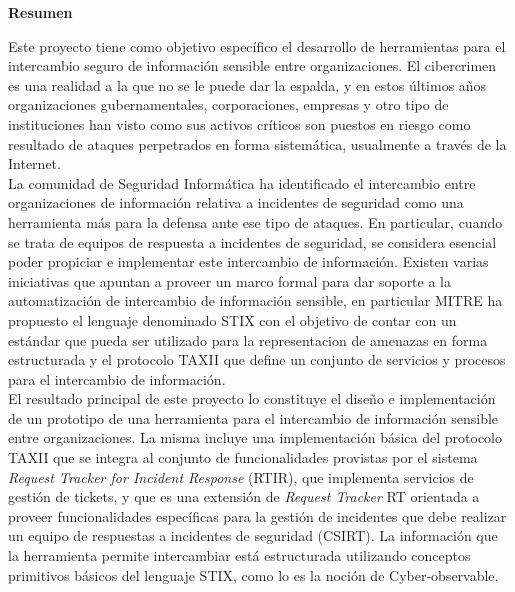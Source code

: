 {\huge \bfseries Resumen \\[0.4cm]}


Este proyecto tiene como objetivo específico el desarrollo de herramientas para el intercambio seguro de información sensible entre organizaciones. El cibercrimen es una realidad a la que no se le puede dar la espalda, y en estos últimos años organizaciones gubernamentales, corporaciones, empresas y otro tipo de instituciones han visto como sus activos críticos son puestos en riesgo como resultado de ataques perpetrados en forma sistemática, usualmente a través de la Internet. \\

La comunidad de Seguridad Informática ha identificado el intercambio entre organizaciones de información relativa a incidentes de seguridad como una herramienta más para la defensa ante ese tipo de ataques. En particular, cuando se trata de equipos de respuesta a incidentes de seguridad, se considera esencial poder propiciar e implementar este intercambio de información.
Existen varias iniciativas que apuntan a  proveer un marco formal para dar soporte a la automatización de intercambio de información sensible, en particular MITRE \cite{mitre} ha propuesto el lenguaje denominado STIX con el objetivo de contar con un estándar que pueda ser utilizado para la representacion de amenazas en forma estructurada y el protocolo TAXII que define un conjunto de servicios y procesos para el intercambio de información. \\

El resultado principal de este proyecto lo constituye el diseño e implementación de un prototipo de una herramienta para el intercambio de información sensible entre organizaciones. La misma incluye una implementación básica del protocolo TAXII que se integra al conjunto de funcionalidades provistas por el sistema \textit{Request Tracker for Incident Response} (RTIR), que implementa servicios de gestión de tickets, y que es una extensión de \textit{Request Tracker} RT orientada a proveer funcionalidades específicas para la gestión de incidentes que debe realizar un equipo de respuestas a incidentes de seguridad (CSIRT). La información que la herramienta permite  intercambiar está estructurada utilizando conceptos primitivos básicos del lenguaje STIX, como lo es la noción de Cyber-observable.
